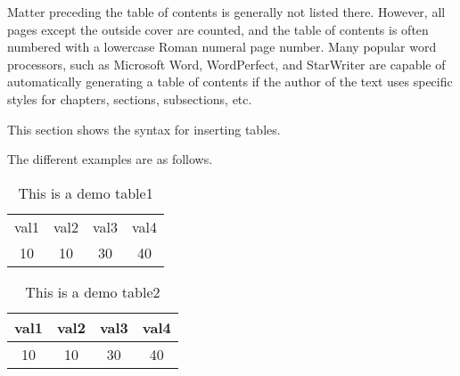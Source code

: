 \documentclass{IEEEtran}
\begin{document}
Matter preceding the table of contents is generally not listed there. However, all pages except the outside cover are counted, and the table of contents is often numbered with a lowercase Roman numeral page number. Many popular word processors, such as Microsoft Word, WordPerfect, and StarWriter are capable of automatically generating a table of contents if the author of the text uses specific styles for chapters, sections, subsections, etc.


This section shows the syntax for inserting tables.

The different examples are as follows.



\begin{table}[h]
	\centering
		\begin{tabular}{c|c|c|c|}
			val1 & val2 & val3 & val4 \\
			10 & 10 & 30 & 40\\
		\end{tabular}
		\caption{This is a demo table1} 
\end{table}





\begin{table}[htbp]
	\centering
	\caption{This is a demo table2}
		\begin{tabular}{|c|c|c|c|} \hline
			val1 & val2 & val3 & val4 \\ \hline
			10 & 10 & 30 & 40\\ \hline
		\end{tabular}
		 
		\label{table1}
\end{table}
\end{document}
